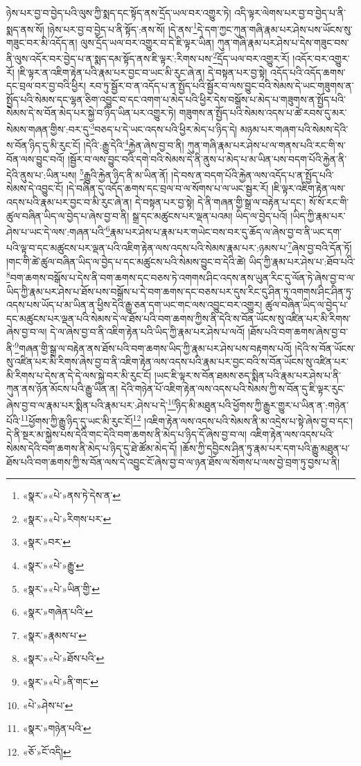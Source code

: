 ཉེས་པར་བྱ་བ་བྱེད་པའི་ལུས་ཀྱི་སྨད་དང་སྟོད་ནས་དྲོད་ཡལ་བར་འགྱུར་ཏེ། འདི་ལྟར་ལེགས་པར་བྱ་བ་བྱེད་པ་ནི་སྨད་ནས་སོ། །ཉེས་པར་བྱ་བ་བྱེད་པ་ནི་སྟོད་:ནས་སོ། །དེ་ནས་\footnote{«སྣར་»«པེ་»ནས་ཏེ་དེས་ན་}དེ་དག་ཀྱང་ཀུན་གཞི་རྣམ་པར་ཤེས་པས་ཡོངས་སུ་གཟུང་བར་མི་འདོད་ན། ལུས་དྲོད་ཡལ་བར་འགྱུར་བ་དེ་ཇི་ལྟར་ཡིན། ཀུན་གཞི་རྣམ་པར་ཤེས་པ་དེས་གཟུང་བས་ནི་ལུས་འདོར་བར་བྱེད་པ་ན་སྨད་དམ་སྟོད་ནས་ཇི་ལྟར་:རིགས་པས་\footnote{«སྣར་»«པེ་»རིགས་པར་}དྲོད་ཡལ་བར་འགྱུར་རོ། །འདོར་བར་འགྱུར་རོ། །ཇི་ལྟར་ན་འཇིག་རྟེན་པའི་རྣམ་པར་བྱང་བ་ཡང་མི་རུང་ཞེ་ན། དེ་བསྟན་པར་བྱ་སྟེ། འདོད་པའི་འདོད་ཆགས་དང་བྲལ་བར་བྱ་བའི་ཕྱིར། རབ་ཏུ་སྦྱོར་བ་ན་འདོད་པ་ན་སྤྱོད་པའི་སྦྱོར་བ་ལས་བྱུང་བའི་སེམས་དེ་ཡང་གཟུགས་ན་སྤྱོད་པའི་སེམས་དང་ལྷན་ཅིག་འབྱུང་བ་དང་འགག་པ་མེད་པའི་ཕྱིར་དེས་བསྒོས་པ་མེད་པ་གཟུགས་ན་སྤྱོད་པའི་སེམས་དེ་ས་བོན་མེད་པར་སྐྱེ་བ་ཉིད་ཡིན་པར་འགྱུར་ཏེ། གཟུགས་ན་སྤྱོད་པའི་སེམས་འདས་པ་ཚེ་རབས་དུ་མར་སེམས་གཞན་གྱིས་:བར་དུ་\footnote{«སྣར་»བར་}བཅད་པ་དེ་ཡང་འདས་པའི་ཕྱིར་མེད་པ་ཉིད་དེ། མཉམ་པར་གཞག་པའི་སེམས་དེའི་ས་བོན་ཉིད་དུ་མི་རུང་ངོ། །དེའི་:རྒྱུ་དེའི་\footnote{«སྣར་»«པེ་»རྒྱུ་}རྐྱེན་ཞེས་བྱ་བ་ནི། ཀུན་གཞི་རྣམ་པར་ཤེས་པ་ལ་གནས་པའི་རང་གི་ས་བོན་ལས་བྱུང་བའོ། །སྦྱོར་བ་ལས་བྱུང་བའི་དགེ་བའི་སེམས་དེ་ནི་ནུས་པ་མེད་པ་མ་ཡིན་པས་བདག་པོའི་རྐྱེན་ནི་དེའི་ནུས་པ་:ཡིན་པས། \footnote{«སྣར་»«པེ་»ཡིན་གྱི་}རྒྱུའི་རྐྱེན་ཉིད་ནི་མ་ཡིན་ནོ། །དེ་བས་ན་བདག་པོའི་རྐྱེན་ལས་འདོད་པ་ན་སྤྱོད་པའི་སེམས་དེ་འབྱུང་ངོ། །དེ་བཞིན་དུ་འདོད་ཆགས་དང་བྲལ་བ་ལ་སོགས་པ་ལ་ཡང་སྦྱར་རོ། །ཇི་ལྟར་འཇིག་རྟེན་ལས་འདས་པའི་རྣམ་པར་བྱང་བ་མི་རུང་ཞེ་ན། དེ་བསྟན་པར་བྱ་སྟེ། དེ་ནི་གཞན་གྱི་སྒྲ་ལ་བརྟེན་པ་དང་། སོ་སོ་རང་གི་ཚུལ་བཞིན་ཡིད་ལ་བྱེད་པ་ཞེས་བྱ་བ་ནི། སྒྲ་དང་མཚུངས་པར་ལྡན་པའམ། ཡིད་ལ་བྱེད་པའོ། །ཡིད་ཀྱི་རྣམ་པར་ཤེས་པ་ཡང་དེ་ལས་:གཞན་པའི་\footnote{«སྣར་»གཞེན་པའི་}རྣམ་པར་ཤེས་པ་རྣམ་པར་གཡེང་བས་བར་དུ་ཆོད་ལ་ཞེས་བྱ་བ་ནི་ཡང་དག་པའི་ལྟ་བ་དང་མཚུངས་པར་ལྡན་པའི་འཇིག་རྟེན་ལས་འདས་པའི་སེམས་རྣམ་པར་:ཉམས་པ་\footnote{«སྣར་»རྣམས་པ་}ཞེས་བྱ་བའི་དོན་ཏོ། །གང་གི་ཚེ་ཚུལ་བཞིན་ཡིད་ལ་བྱེད་པ་དང་མཚུངས་པའི་སེམས་བྱུང་བ་དེའི་ཚེ། ཡིད་ཀྱི་རྣམ་པར་ཤེས་པ་:ཐོབ་པའི་\footnote{«སྣར་»«པེ་»ཐོས་པའི་}བག་ཆགས་བསྒོས་པ་དེས་ནི་བག་ཆགས་དང་བཅས་ཏེ་འགགས་ཤིང་འདས་ནས་ཡུན་རིང་དུ་ལོན་ཏེ་ཞེས་བྱ་བ་ལ་ཡིད་ཀྱི་རྣམ་པར་ཤེས་པ་ཐོས་པས་བསྒོས་པ་དེ་བག་ཆགས་དང་བཅས་པར་དུས་རིང་དུ་ཤིན་ཏུ་འགགས་ཤིང་ཤིན་ཏུ་འདས་པས་ཡོད་པ་མ་ཡིན་ན་ཕྱིས་དེའི་རྒྱུ་ཅན་དག་ཡང་གང་ལས་འབྱུང་བར་འགྱུར། ཚུལ་བཞིན་ཡིད་ལ་བྱེད་པ་དང་མཚུངས་པར་ལྡན་པའི་སེམས་དེ་ལ་ཐོས་པའི་བག་ཆགས་ཀྱིས་ནི་དེའི་ས་བོན་ཡོངས་སུ་འཛིན་པར་མི་རིགས་ཞེས་བྱ་བ་ལ། དེ་ལ་ཞེས་བྱ་བ་ནི་འཇིག་རྟེན་པའི་ཡིད་ཀྱི་རྣམ་པར་ཤེས་པ་ལའོ། །ཐོས་པའི་བག་ཆགས་ཞེས་བྱ་བ་ནི་\footnote{«སྣར་»«པེ་»ནི་གང་}གཞན་གྱི་སྒྲ་ལ་བརྟེན་ནས་ཐོས་པའི་བག་ཆགས་ཡིད་ཀྱི་རྣམ་པར་ཤེས་པས་བརྟགས་པའོ། །དེའི་ས་བོན་ཡོངས་སུ་འཛིན་པར་མི་རིགས་ཞེས་བྱ་བ་ནི་འཇིག་རྟེན་ལས་འདས་པའི་རྣམ་པར་བྱང་བའི་ས་བོན་ཡོངས་སུ་འཛིན་པར་མི་རིགས་པ་དེས་ན་དེ་དེ་ལས་སྐྱེ་བར་མི་རུང་ངོ། །ཡང་ཇི་ལྟར་ས་བོན་ཐམས་ཅད་སྨིན་པའི་རྣམ་པར་ཤེས་པ་ནི་ཀུན་ནས་ཉོན་མོངས་པའི་རྒྱུ་ཡིན་ན། དེའི་གཉེན་པོ་འཇིག་རྟེན་ལས་འདས་པའི་སེམས་ཀྱི་ས་བོན་དུ་ཇི་ལྟར་རུང་ཞེས་བྱ་བ་ལ་རྣམ་པར་སྨིན་པའི་རྣམ་པར་:ཤེས་པ་དེ་\footnote{«པེ་»ཤེས་པ་}ཉིད་མི་མཐུན་པའི་ཕྱོགས་ཀྱི་རྒྱུར་གྱུར་པ་ཡིན་ན་:གཉེན་པོའི་\footnote{«སྣར་»གཉེན་པའི་}ཕྱོགས་ཀྱི་རྒྱུ་ཉིད་དུ་ཡང་མི་རུང་ངོ།\footnote{«ཅོ་»ངོ་འདི།} །འཇིག་རྟེན་ལས་འདས་པའི་སེམས་ནི་མ་འདྲེས་པ་སྟེ་ཞེས་བྱ་བ་དང་། དེ་ནི་སྔར་མ་སྐྱེས་པས་དེའི་གང་དེའི་བག་ཆགས་ནི་མེད་པ་ཉིད་དོ་ཞེས་བྱ་བ་ལ། འཇིག་རྟེན་ལས་འདས་པའི་སེམས་དེའི་བག་ཆགས་ནི་མེད་པ་ཉིད་དུ་ཐེ་ཚོམ་མེད་དོ། །ཆོས་ཀྱི་དབྱིངས་ཤིན་ཏུ་རྣམ་པར་དག་པའི་རྒྱུ་མཐུན་པ་ཐོས་པའི་བག་ཆགས་ཀྱི་ས་བོན་ལས་དེ་འབྱུང་ངོ་ཞེས་བྱ་བ་ལ་ཉན་ཐོས་ལ་སོགས་པ་ལས་བྱེ་བྲག་ཏུ་བྱས་པ་ནི། 